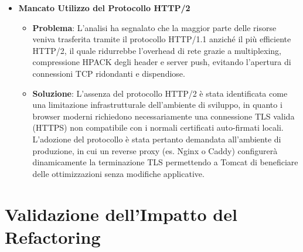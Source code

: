 \begin{itemize}
\begin{itemize}
        \item \textbf{Problema}: L'utilizzo di container nidificati ridondanti (come quelli derivati dallo stile Bootstrap non ottimizzato) nelle griglie dinamiche aumentava inutilmente la complessità dell'albero DOM. Un DOM inutilmente profondo comporta un maggiore carico computazionale per la CPU del client durante le fasi di parsing, layouting e rendering.
        \item \textbf{Soluzione}: Per arginare l'eccessiva complessità del DOM e minimizzare l'impatto sul client, i container nidificati ridondanti di Bootstrap nei cicli JSP sono stati sostituiti con tag semantici HTML5 (come \texttt{<article>}), riducendo il numero totale di nodi e alleggerendo notevolmente il parsing della pagina anche durante i test di carico (es. 50 prodotti contemporanei).
    \end{itemize}
    \item \textbf{Mancato Utilizzo del Protocollo HTTP/2}
    \begin{itemize}
        \item \textbf{Problema}: L'analisi ha segnalato che la maggior parte delle risorse veniva trasferita tramite il protocollo HTTP/1.1 anziché il più efficiente HTTP/2, il quale ridurrebbe l'overhead di rete grazie a multiplexing, compressione HPACK degli header e server push, evitando l'apertura di connessioni TCP ridondanti e dispendiose.
        \item \textbf{Soluzione}: L'assenza del protocollo HTTP/2 è stata identificata come una limitazione infrastrutturale dell'ambiente di sviluppo, in quanto i browser moderni richiedono necessariamente una connessione TLS valida (HTTPS) non compatibile con i normali certificati auto-firmati locali. L'adozione del protocollo è stata pertanto demandata all'ambiente di produzione, in cui un reverse proxy (es. Nginx o Caddy) configurerà dinamicamente la terminazione TLS permettendo a Tomcat di beneficiare delle ottimizzazioni senza modifiche applicative.
    \end{itemize}
\end{itemize}

\section{Validazione dell'Impatto del Refactoring}

